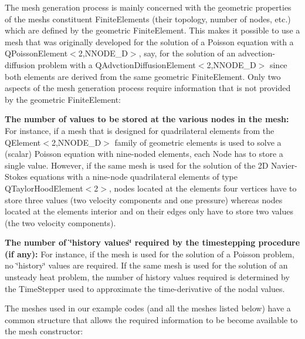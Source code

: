The mesh generation process is mainly concerned with the geometric properties of the mesh\textquotesingle{}s constituent {\ttfamily Finite\+Elements} (their topology, number of nodes, etc.) which are defined by the geometric {\ttfamily Finite\+Element}. This makes it possible to use a mesh that was originally developed for the solution of a Poisson equation with a {\ttfamily Q\+Poisson\+Element$<$2,\+N\+N\+O\+D\+E\+\_\+D$>$}, say, for the solution of an advection-\/diffusion problem with a {\ttfamily Q\+Advction\+Diffusion\+Element$<$2,\+N\+N\+O\+D\+E\+\_\+D$>$} since both elements are derived from the same geometric {\ttfamily Finite\+Element}. Only two aspects of the mesh generation process require information that is not provided by the geometric {\ttfamily Finite\+Element\+:} 
\begin{DoxyItemize}
\item {\bfseries The number of values to be stored at the various nodes in the mesh\+:} For instance, if a mesh that is designed for quadrilateral elements from the {\ttfamily Q\+Element$<$2,\+N\+N\+O\+D\+E\+\_\+D$>$} family of geometric elements is used to solve a (scalar) Poisson equation with nine-\/noded elements, each {\ttfamily Node} has to store a single value. However, if the same mesh is used for the solution of the 2D Navier-\/\+Stokes equations with a nine-\/node quadrilateral elements of type {\ttfamily Q\+Taylor\+Hood\+Element$<$2$>$}, nodes located at the elements\textquotesingle{} four vertices have to store three values (two velocity components and one pressure) whereas nodes located at the elements\textquotesingle{} interior and on their edges only have to store two values (the two velocity components). ~\newline
~\newline

\item {\bfseries The number of \char`\"{}history values\char`\"{} required by the timestepping procedure (if any)\+:} For instance, if the mesh is used for the solution of a Poisson problem, no \char`\"{}history\char`\"{} values are required. If the same mesh is used for the solution of an unsteady heat problem, the number of history values required is determined by the {\ttfamily Time\+Stepper} used to approximate the time-\/derivative of the nodal values.
\end{DoxyItemize}The meshes used in our example codes (and all the meshes listed below) have a common structure that allows the required information to be become available to the mesh constructor\+:
